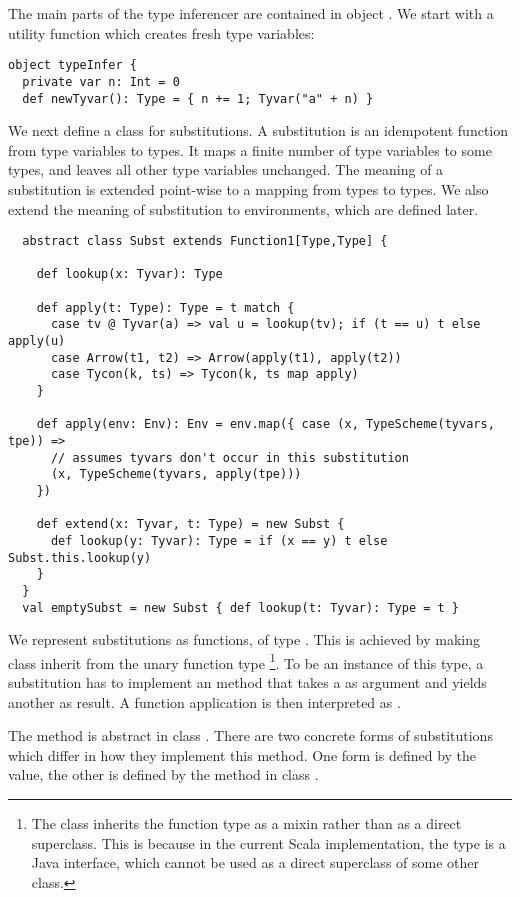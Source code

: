 {The main parts of the type inferencer are contained in object
. We start with a utility function which creates
fresh type variables:
\begin{lstlisting}
object typeInfer {
  private var n: Int = 0
  def newTyvar(): Type = { n += 1; Tyvar("a" + n) }
\end{lstlisting}
We next define a class for substitutions. A substitution is an
idempotent function from type variables to types. It maps a finite
number of type variables to some types, and leaves all other type
variables unchanged. The meaning of a substitution is extended
point-wise to a mapping from types to types. We also extend
the meaning of substitution to environments, which are defined
later.
\begin{lstlisting}
  abstract class Subst extends Function1[Type,Type] {

    def lookup(x: Tyvar): Type

    def apply(t: Type): Type = t match {
      case tv @ Tyvar(a) => val u = lookup(tv); if (t == u) t else apply(u)
      case Arrow(t1, t2) => Arrow(apply(t1), apply(t2))
      case Tycon(k, ts) => Tycon(k, ts map apply)
    }

    def apply(env: Env): Env = env.map({ case (x, TypeScheme(tyvars, tpe)) =>
      // assumes tyvars don't occur in this substitution
      (x, TypeScheme(tyvars, apply(tpe)))
    })

    def extend(x: Tyvar, t: Type) = new Subst {
      def lookup(y: Tyvar): Type = if (x == y) t else Subst.this.lookup(y)
    }
  }
  val emptySubst = new Subst { def lookup(t: Tyvar): Type = t }
\end{lstlisting}
We represent substitutions as functions, of type . This is achieved by making class  inherit from the
unary function type \footnote{
The class inherits the function type as a mixin rather than as a direct 
superclass. This is because in the current Scala implementation, the
 type is a Java interface, which cannot be used as a direct
superclass of some other class.}.
To be an instance
of this type, a substitution  has to implement an 
method that takes a  as argument and yields another
 as result. A function application  is then
interpreted as .

The  method is abstract in class .  There are
two concrete forms of substitutions which differ in how they
implement this method.  One form is defined by the  value,
the other is defined by the  method in class
.

}
